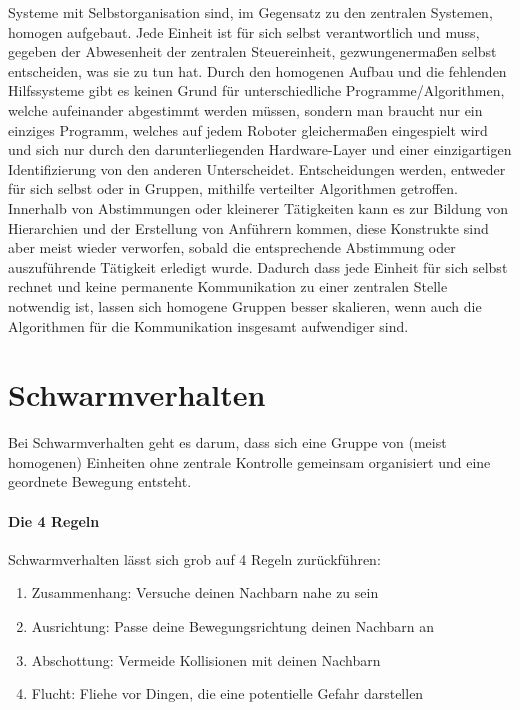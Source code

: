 Systeme mit Selbstorganisation sind, im Gegensatz zu den zentralen Systemen, homogen aufgebaut.
Jede Einheit ist für sich selbst verantwortlich und muss, gegeben der Abwesenheit der zentralen Steuereinheit, gezwungenermaßen selbst entscheiden, was sie zu tun hat.
Durch den homogenen Aufbau und die fehlenden Hilfssysteme gibt es keinen Grund für unterschiedliche Programme/Algorithmen, welche aufeinander abgestimmt werden müssen, sondern man braucht nur ein einziges Programm, welches auf jedem Roboter gleichermaßen eingespielt wird und sich nur durch den darunterliegenden Hardware-Layer und einer einzigartigen Identifizierung von den anderen Unterscheidet.
Entscheidungen werden, entweder für sich selbst oder in Gruppen, mithilfe verteilter Algorithmen getroffen.
Innerhalb von Abstimmungen oder kleinerer Tätigkeiten kann es zur Bildung von Hierarchien und der Erstellung von Anführern kommen, diese Konstrukte sind aber meist wieder verworfen, sobald die entsprechende Abstimmung oder auszuführende Tätigkeit erledigt wurde.
Dadurch dass jede Einheit für sich selbst rechnet und keine permanente Kommunikation zu einer zentralen Stelle notwendig ist, lassen sich homogene Gruppen besser skalieren, wenn auch die Algorithmen für die Kommunikation insgesamt aufwendiger sind.

\section{Schwarmverhalten}\label{sec:Schwarmverhalten}

Bei Schwarmverhalten geht es darum, dass sich eine Gruppe von (meist homogenen) Einheiten ohne zentrale Kontrolle gemeinsam organisiert und eine geordnete Bewegung entsteht.

\paragraph*{Die 4 Regeln}\label{4Rules}
Schwarmverhalten lässt sich grob auf 4 Regeln zurückführen:

\begin{enumerate}
	\item Zusammenhang: Versuche deinen Nachbarn nahe zu sein
	\item Ausrichtung: Passe deine Bewegungsrichtung deinen Nachbarn an
	\item Abschottung: Vermeide Kollisionen mit deinen Nachbarn
	\item Flucht: Fliehe vor Dingen, die eine potentielle Gefahr darstellen\cite{ArtificalFear}
\end{enumerate}

